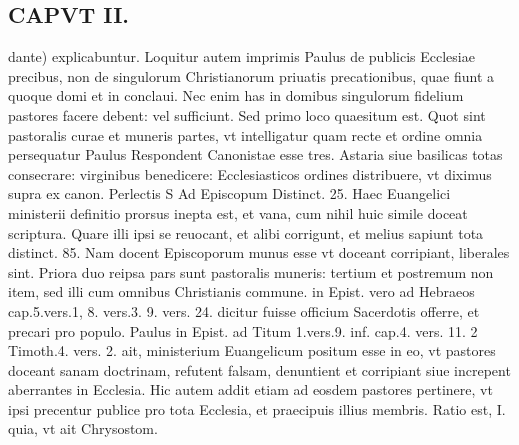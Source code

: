 \documentclass{article}
\begin{document}
\begin{pages}
\section*{CAPVT  II. }
\marginpar{[ p.39 ]}\pstart dante) explicabuntur. Loquitur autem imprimis Paulus de publicis Ecclesiae precibus, non de singulorum Christianorum priuatis precationibus, quae fiunt a quoque domi et in conclaui. Nec enim has in domibus singulorum fidelium pastores facere debent: vel sufficiunt. Sed primo loco quaesitum est. Quot sint pastoralis curae et muneris partes, vt intelligatur quam recte et ordine omnia persequatur Paulus Respondent Canonistae esse tres. Astaria siue basilicas totas consecrare: virginibus benedicere: Ecclesiasticos ordines distribuere, vt diximus supra ex canon. Perlectis S Ad Episcopum Distinct. 25. Haec Euangelici ministerii definitio prorsus inepta est, et vana, cum nihil huic simile doceat scriptura. Quare illi ipsi se reuocant, et alibi corrigunt, et melius sapiunt tota distinct. 85. Nam docent Episcoporum munus esse vt doceant corripiant, liberales sint. Priora duo reipsa pars sunt pastoralis muneris: tertium et postremum non item, sed illi cum omnibus Christianis commune. in Epist. vero ad Hebraeos cap.5.vers.1, 8. vers.3. 9. vers. 24. dicitur fuisse officium Sacerdotis offerre, et precari pro populo. Paulus in Epist. ad Titum 1.vers.9. inf. cap.4. vers. 11. 2 Timoth.4. vers. 2. ait, ministerium Euangelicum positum esse in eo, vt pastores doceant sanam doctrinam, refutent falsam, denuntient et corripiant siue increpent aberrantes in Ecclesia. Hic autem addit etiam ad eosdem pastores pertinere, vt ipsi precentur publice pro tota Ecclesia, et praecipuis illius membris. Ratio est, I. quia, vt ait Chrysostom.  \pend

\end{pages}
\end{document}
